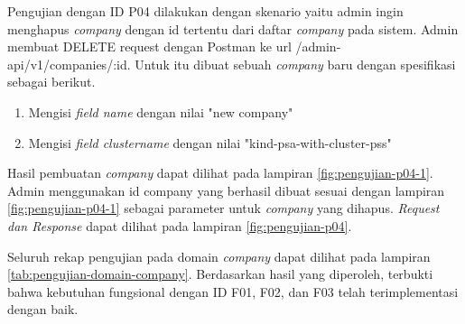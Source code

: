 Pengujian dengan ID P04 dilakukan dengan skenario yaitu admin ingin menghapus \textit{company} dengan id tertentu dari daftar \textit{company} pada sistem. Admin membuat DELETE request dengan Postman ke url /admin-api/v1/companies/:id. Untuk itu dibuat sebuah \textit{company} baru dengan spesifikasi sebagai berikut.

\begin{enumerate}
  \item Mengisi \textit{field name} dengan nilai "new company"
  \item Mengisi \textit{field cluster\textunderscore name} dengan nilai "kind-psa-with-cluster-pss"
\end{enumerate}

Hasil pembuatan \textit{company} dapat dilihat pada lampiran \ref{fig:pengujian-p04-1}. Admin menggunakan id company yang berhasil dibuat sesuai dengan lampiran \ref{fig:pengujian-p04-1} sebagai parameter untuk \textit{company} yang dihapus. \textit{Request dan Response} dapat dilihat pada lampiran \ref{fig:pengujian-p04}.

Seluruh rekap pengujian pada domain \textit{company} dapat dilihat pada lampiran \ref{tab:pengujian-domain-company}. Berdasarkan hasil yang diperoleh, terbukti bahwa kebutuhan fungsional dengan ID F01, F02, dan F03 telah terimplementasi dengan baik.
